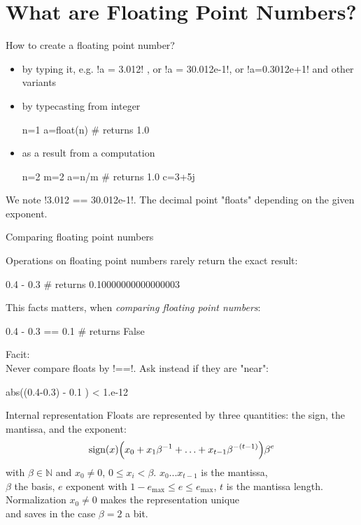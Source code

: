 \part{What are Floating Point Numbers?}
\frame{\partpage}
\begin{frame}[fragile]{How to create a floating point number?}
\begin{itemize}
\item by typing it, e.g. \pyth!a = 3.012! , or \pyth!a = 30.012e-1!, or \pyth!a=0.3012e+1! and other variants
\item by typecasting from integer
\begin{python}
n=1
a=float(n) # returns 1.0
\end{python}
\item as a result from a computation
\begin{python}
n=2
m=2
a=n/m   # returns 1.0
c=3+5j
\end{python}
\end{itemize}

We note \pyth!3.012 == 30.012e-1!. The decimal point "floats" depending on the given exponent.
\end{frame}
\begin{frame}[fragile]{Comparing floating point numbers}

Operations on floating point numbers rarely return the exact result:
\begin{python}
0.4 - 0.3 # returns 0.10000000000000003
\end{python}
This facts matters, when \emph{comparing floating point numbers}:
\begin{python}
0.4 - 0.3 == 0.1  # returns False
\end{python}

Facit:\\
Never compare floats by \pyth!==!. Ask instead if they are "near":
\begin{python}
abs((0.4-0.3) - 0.1 ) < 1.e-12
\end{python}
\end{frame}
\begin{frame}[fragile]{Internal representation}
Floats are represented by three quantities: the sign, the mantissa, and the exponent:
\[
\mathrm{sign} (x) \Bigl ( x_0 + x_1 \beta^{-1} + \ldots +
x_{t-1}\beta^{-(t-1)} \Bigr ) \beta^{e}
\]
with $\beta \in \mathbb{N}$ and
$x_0 \ne 0$, $0 \le x_i < \beta$.
\vfill
$x_0...x_{t-1}$ is the mantissa,\\
$\beta$ the basis,
$e$ exponent with $1-e_{\max} \le e \le e_{\max} $,
$t$ is the mantissa length.
\vfill
Normalization $x_0 \ne 0$  makes the representation unique\\
\hfill and saves in the case $\beta=2$ a bit.
\end{frame}
